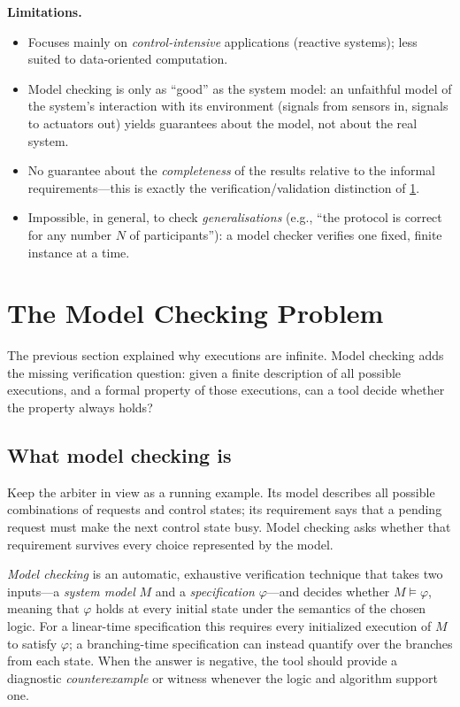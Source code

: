 \textbf{Limitations.}
\begin{itemize}[nosep]
  \item Focuses mainly on \emph{control-intensive} applications
        (reactive systems); less suited to data-oriented computation.
  \item Model checking is only as ``good'' as the system model: an
        unfaithful model of the system's interaction with its environment
        (signals from sensors in, signals to actuators out) yields
        guarantees about the model, not about the real system.
  \item No guarantee about the \emph{completeness} of the results relative
        to the informal requirements---this is exactly the
        verification/validation distinction of \cref{sec:mc-problem}.
  \item Impossible, in general, to check \emph{generalisations} (e.g., ``the
        protocol is correct for any number $N$ of participants''): a model
        checker verifies one fixed, finite instance at a time.
\end{itemize}

\section{The Model Checking Problem}
\label{sec:mc-problem}

The previous section explained why executions are infinite.  Model checking
adds the missing verification question: given a finite description of all
possible executions, and a formal property of those executions, can a tool
decide whether the property always holds?

\subsection{What model checking is}

Keep the arbiter in view as a running example.  Its model describes all
possible combinations of requests and control states; its requirement says
that a pending request must make the next control state busy.  Model checking
asks whether that requirement survives every choice represented by the model.

\begin{definition}
\label{def:model-checking}
\emph{Model checking} is an automatic, exhaustive verification technique
that takes two inputs---a \emph{system model} $M$ and a \emph{specification}
$\varphi$---and decides whether $M\models\varphi$, meaning that $\varphi$
holds at every initial state under the semantics of the chosen logic.  For a
linear-time specification this requires every initialized execution of $M$ to
satisfy $\varphi$; a branching-time specification can instead quantify over
the branches from each state.  When the answer is negative, the tool should
provide a diagnostic
\emph{counterexample} or witness whenever the logic and algorithm support
one.
\end{definition}

